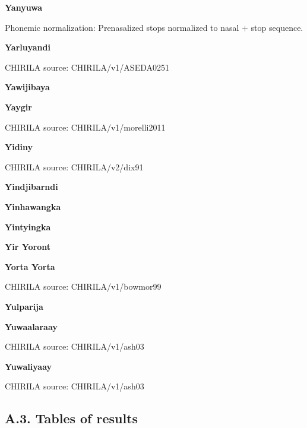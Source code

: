 \textbf{Yanyuwa}


Phonemic normalization: Prenasalized stops normalized to nasal + stop
sequence.

\textbf{Yarluyandi}

CHIRILA source: CHIRILA/v1/ASEDA0251


\textbf{Yawijibaya}


\textbf{Yaygir}

CHIRILA source: CHIRILA/v1/morelli2011


\textbf{Yidiny}

CHIRILA source: CHIRILA/v2/dix91


\textbf{Yindjibarndi}


\textbf{Yinhawangka}


\textbf{Yintyingka}


\textbf{Yir Yoront}


\textbf{Yorta Yorta}

CHIRILA source: CHIRILA/v1/bowmor99


\textbf{Yulparija}


\textbf{Yuwaalaraay}

CHIRILA source: CHIRILA/v1/ash03


\textbf{Yuwaliyaay}

CHIRILA source: CHIRILA/v1/ash03


\newpage

\hypertarget{a.3.-tables-of-results}{%
\subsection{A.3. Tables of results}\label{a.3.-tables-of-results}}

